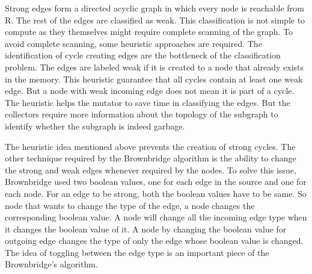 Strong edges form a directed acyclic graph in which every node is reachable from R. The rest of the edges are classified as weak. This classification is not simple to compute as they themselves might require complete scanning of the graph. To avoid complete scanning, some heuristic approaches are required. The identification of cycle creating edges are the bottleneck of the classification problem. The edges are  labeled weak if it is created to a node that already exists in the memory. This heuristic guarantee that all cycles contain at least one weak edge. But a node with weak incoming edge does not mean it is part of a cycle. The heuristic helps the mutator to save time in classifying the edges. But the collectors require more information about the topology of the subgraph to identify whether the subgraph is indeed garbage. 

The heuristic idea mentioned above prevents the creation of strong cycles. The other technique required by the Brownbridge algorithm is the ability to change the strong and weak edges whenever required by the nodes. To solve this issue, Brownbridge used two boolean values, one for each edge in the source and one for each node. For an edge to be strong, both the boolean values have to be same. So node that wants to change the type of the edge, a node changes the corresponding boolean value. A node will change all the incoming edge type when it changes the boolean value of it. A node by changing the boolean value for outgoing edge changes the type of only the edge whose boolean value is changed. The idea of toggling between the edge type is an important piece of the Brownbridge's algorithm.

